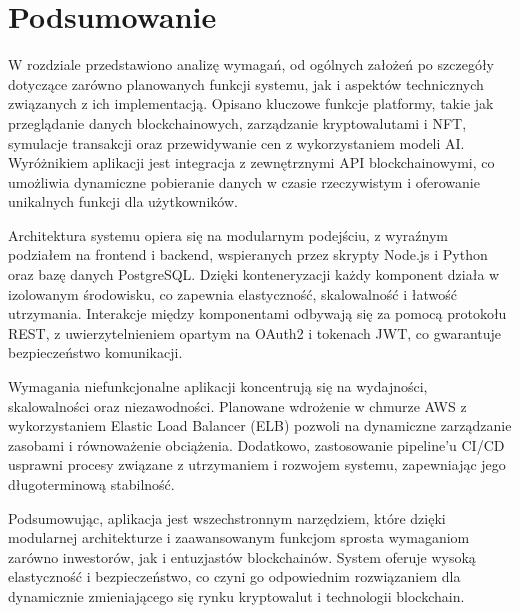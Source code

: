 \section{Podsumowanie}

W rozdziale przedstawiono analizę wymagań, od ogólnych założeń po szczegóły dotyczące zarówno planowanych funkcji systemu, jak i aspektów technicznych związanych z ich implementacją. Opisano kluczowe funkcje platformy, takie jak przeglądanie danych blockchainowych, zarządzanie kryptowalutami i NFT, symulacje transakcji oraz przewidywanie cen z wykorzystaniem modeli AI. Wyróżnikiem aplikacji jest integracja z zewnętrznymi API blockchainowymi, co umożliwia dynamiczne pobieranie danych w czasie rzeczywistym i oferowanie unikalnych funkcji dla użytkowników.

Architektura systemu opiera się na modularnym podejściu, z wyraźnym podziałem na frontend i backend, wspieranych przez skrypty Node.js i Python oraz bazę danych PostgreSQL. Dzięki konteneryzacji każdy komponent działa w izolowanym środowisku, co zapewnia elastyczność, skalowalność i łatwość utrzymania. Interakcje między komponentami odbywają się za pomocą protokołu REST, z uwierzytelnieniem opartym na OAuth2 i tokenach JWT, co gwarantuje bezpieczeństwo komunikacji.

Wymagania niefunkcjonalne aplikacji koncentrują się na wydajności, skalowalności oraz niezawodności. Planowane wdrożenie w chmurze AWS z wykorzystaniem Elastic Load Balancer (ELB) pozwoli na dynamiczne zarządzanie zasobami i równoważenie obciążenia. Dodatkowo, zastosowanie pipeline’u CI/CD usprawni procesy związane z utrzymaniem i rozwojem systemu, zapewniając jego długoterminową stabilność.

Podsumowując, aplikacja jest wszechstronnym narzędziem, które dzięki modularnej architekturze i zaawansowanym funkcjom sprosta wymaganiom zarówno inwestorów, jak i entuzjastów blockchainów. System oferuje wysoką elastyczność i bezpieczeństwo, co czyni go odpowiednim rozwiązaniem dla dynamicznie zmieniającego się rynku kryptowalut i technologii blockchain.

